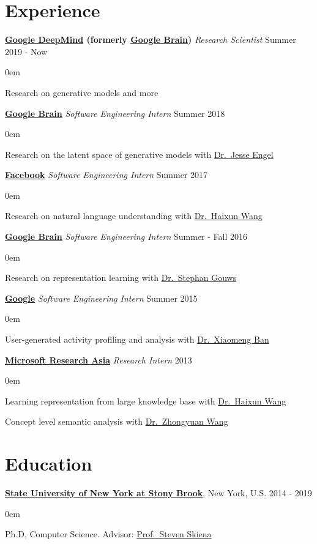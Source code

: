 \documentclass[line,margin]{cv}
\makeatletter
\newenvironment{block}
{
  \begin{addmargin}[2em]{0em}%
}
{
  \end{addmargin}
}
\newcommand{\SUNY}{\href{http://www.stonybrook.edu/}{State University of New York at Stony Brook}}
\newcommand{\Google}{\href{https://www.google.com/}{Google}}
\newcommand{\GoogleBrain}{\href{http://research.google.com/teams/brain/}{Google Brain}}
\newcommand{\GoogleDeepMind}{\href{https://www.deepmind.com/}{Google DeepMind}}
\newcommand{\Facebook}{\href{https://www.facebook.com/}{Facebook}}
\newcommand{\MyMail}{\href{mailto:alan.yt.tian@gmail.com}{alan.yt.tian@gmail.com}}
\newcommand{\MSRA}{\href{http://research.microsoft.com/en-us/labs/asia/default.aspx}{Microsoft Research Asia}}
\newcommand{\Haixun}{\href{http://haixun.olidu.com/}{Dr.\ Haixun Wang}}
\newcommand{\Zhongyuan}{\href{http://www.wangzhongyuan.com/}{Dr.\ Zhongyuan Wang}}
\newcommand{\Xiaomeng}{\href{https://www.linkedin.com/in/xiaomengban/}{Dr.\ Xiaomeng Ban}}
\newcommand{\Skiena}{\href{https://www3.cs.stonybrook.edu/~skiena/}{Prof.\ Steven Skiena}}
\newcommand{\sgouws}{\href{http://research.google.com/pubs/StephanGouws.html}{Dr.\ Stephan Gouws}}
\newcommand{\jesseengel}{\href{https://ai.google/research/people/JesseEngel}{Dr.\ Jesse Engel}}
\makeatother
\begin{document}

\address{\textit{E-mail:} \MyMail}

\begin{resume}

\section{Experience}

  {\bf \GoogleDeepMind{} (formerly \GoogleBrain)} {\itshape Research Scientist} \hfill Summer 2019 - Now
  \begin{block}
    Research on generative models and more
  \end{block}

  {\bf \GoogleBrain} {\itshape Software Engineering Intern} \hfill Summer 2018
  \begin{block}
    Research on the latent space of generative models with \jesseengel
  \end{block}

  {\bf \Facebook} {\itshape Software Engineering Intern} \hfill Summer 2017
  \begin{block}
    Research on natural language understanding with \Haixun
  \end{block}

  {\bf \GoogleBrain} {\itshape Software Engineering Intern} \hfill Summer - Fall 2016
  \begin{block}
    Research on representation learning with \sgouws
  \end{block}

  {\bf \Google} {\itshape Software Engineering Intern} \hfill Summer 2015
  \begin{block}
    User-generated activity profiling and analysis with \Xiaomeng
  \end{block}

  {\bf \MSRA} {\itshape Research Intern} \hfill 2013

  \begin{block}
    Learning representation from large knowledge base with \Haixun

    Concept level semantic analysis with \Zhongyuan
  \end{block}

\section{Education}

  {\bf \SUNY}, New York, U.S. \hfill 2014 - 2019
  \begin{block}
    Ph.D, Computer Science. Advisor: \Skiena
  \end{block}


\end{resume}
\end{document}
